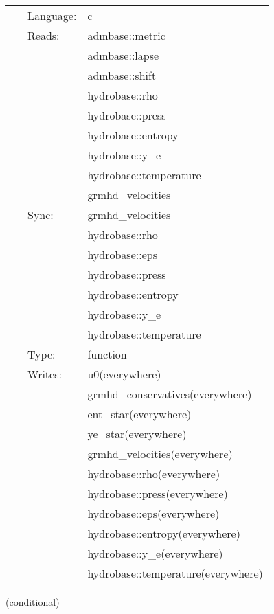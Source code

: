 \hspace{5mm}{\it entropy+tabulated version of grhaylhd\_outer\_boundaries } 


\hspace{5mm}

 \begin{tabular*}{160mm}{cll} 
~ & Language:  & c \\ 
~ & Reads:  & admbase::metric \\ 
~& ~ &admbase::lapse\\ 
~& ~ &admbase::shift\\ 
~& ~ &hydrobase::rho\\ 
~& ~ &hydrobase::press\\ 
~& ~ &hydrobase::entropy\\ 
~& ~ &hydrobase::y\_e\\ 
~& ~ &hydrobase::temperature\\ 
~& ~ &grmhd\_velocities\\ 
~ & Sync:  & grmhd\_velocities \\ 
~& ~ &hydrobase::rho\\ 
~& ~ &hydrobase::eps\\ 
~& ~ &hydrobase::press\\ 
~& ~ &hydrobase::entropy\\ 
~& ~ &hydrobase::y\_e\\ 
~& ~ &hydrobase::temperature\\ 
~ & Type:  & function \\ 
~ & Writes:  & u0(everywhere) \\ 
~& ~ &grmhd\_conservatives(everywhere)\\ 
~& ~ &ent\_star(everywhere)\\ 
~& ~ &ye\_star(everywhere)\\ 
~& ~ &grmhd\_velocities(everywhere)\\ 
~& ~ &hydrobase::rho(everywhere)\\ 
~& ~ &hydrobase::press(everywhere)\\ 
~& ~ &hydrobase::eps(everywhere)\\ 
~& ~ &hydrobase::entropy(everywhere)\\ 
~& ~ &hydrobase::y\_e(everywhere)\\ 
~& ~ &hydrobase::temperature(everywhere)\\ 
\end{tabular*} 


\vspace{5mm}

   (conditional) 

